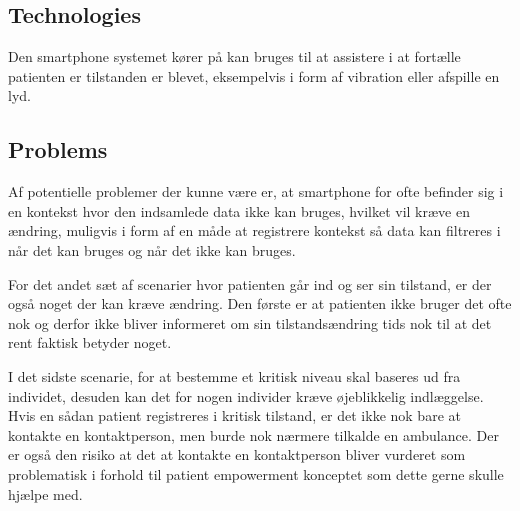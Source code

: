 \subsection{Technologies}
Den smartphone systemet kører på kan bruges til at assistere i at fortælle patienten er tilstanden er blevet, eksempelvis i form af vibration eller afspille en lyd.

\subsection{Problems}
Af potentielle problemer der kunne være er, at smartphone for ofte befinder sig i en kontekst hvor den indsamlede data ikke kan bruges, hvilket vil kræve en ændring, muligvis i form af en måde at registrere kontekst så data kan filtreres i når det kan bruges og når det ikke kan bruges.

For det andet sæt af scenarier hvor patienten går ind og ser sin tilstand, er der også noget der kan kræve ændring.
Den første er at patienten ikke bruger det ofte nok og derfor ikke bliver informeret om sin tilstandsændring tids nok til at det rent faktisk betyder noget.

I det sidste scenarie, for at bestemme et kritisk niveau skal baseres ud fra individet, desuden kan det for nogen individer kræve øjeblikkelig indlæggelse.
Hvis en sådan patient registreres i kritisk tilstand, er det ikke nok bare at kontakte en kontaktperson, men burde nok nærmere tilkalde en ambulance.
Der er også den risiko at det at kontakte en kontaktperson bliver vurderet som problematisk i forhold til patient empowerment konceptet som dette gerne skulle hjælpe med. 

